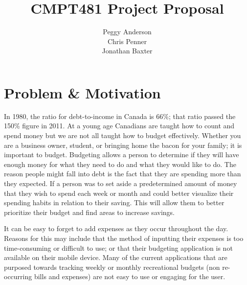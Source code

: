 \documentclass{chi2011}
\begin{document}
\setlength{\paperheight}{11in}
\setlength{\paperwidth}{8.5in}
\setlength{\pdfpageheight}{\paperheight}
\setlength{\pdfpagewidth}{\paperwidth}


\title{CMPT481 Project Proposal}
\author{
\alignauthor Peggy Anderson\\
    \alignauthor Chris Penner\\
    \alignauthor Jonathan Baxter\\
}


\maketitle

\section{Problem \& Motivation}

In 1980, the ratio for debt-to-income in Canada is 66\%; that ratio passed the 150\% figure in 2011. At a young age
Canadians are taught how to count and spend money but we are not all taught how to budget effectively. Whether you are
a business owner, student, or bringing home the bacon for your family; it is important to budget. Budgeting allows a
person to determine if they will have enough money for what they need to do and what they would like to do. The reason
people might fall into debt is the fact that they are spending more than they expected. If a person was to set aside a
predetermined amount of money that they wish to spend each week or month and could better visualize their spending
habits in relation to their saving. This will allow them to better prioritize their budget and find areas to increase
savings.

It can be easy to forget to add expenses as they occur throughout the day. Reasons for this may include that the method
of inputting their expenses is too time-consuming or difficult to use; or that their budgeting application is not
available on their mobile device. Many of the current applications that are purposed towards tracking weekly or monthly
recreational budgets (non re-occurring bills and expenses) are not easy to use or engaging for the user.
\end{document}
